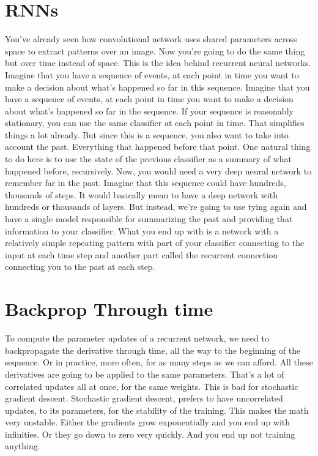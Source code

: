 \documentclass{article}
\begin{document}
\section{RNNs}
You've already seen how convolutional
network uses shared parameters across
space to extract patterns over an image.
Now you're going to do the same thing
but over time instead of space.
This is the idea behind
recurrent neural networks.
Imagine that you have a sequence
of events, at each point in time
you want to make a decision about what's
happened so far in this sequence.
Imagine that you have a sequence
of events, at each point in time
you want to make a decision about
what's happened so far in the sequence.
If your sequence is
reasonably stationary,
you can use the same classifier
at each point in time.
That simplifies things a lot already.
But since this is a sequence, you also
want to take into account the past.
Everything that happened
before that point.
One natural thing to do here is to use
the state of the previous classifier
as a summary of what happened before,
recursively.
Now, you would need a very deep neural
network to remember far in the past.
Imagine that this sequence could
have hundreds, thousands of steps.
It would basically mean to have
a deep network with hundreds or
thousands of layers.
But instead,
we're going to use tying again and
have a single model responsible for
summarizing the past and
providing that information
to your classifier.
What you end up with is a network with a
relatively simple repeating pattern with
part of your classifier connecting to
the input at each time step and another
part called the recurrent connection
connecting you to the past at each step.
\section{Backprop Through time}
To compute the parameter
updates of a recurrent network,
we need to backpropagate
the derivative through time,
all the way to the beginning
of the sequence.
Or in practice, more often, for
as many steps as we can afford.
All these derivatives are going to
be applied to the same parameters.
That's a lot of correlated updates
all at once, for the same weights.
This is bad for
stochastic gradient descent.
Stochastic gradient descent,
prefers to have uncorrelated updates,
to its parameters, for
the stability of the training.
This makes the math very unstable.
Either the gradients grow exponentially
and you end up with infinities.
Or they go down to zero very quickly.
And you end up not training anything.
\end{document}
